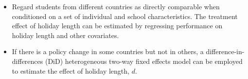 \documentclass[12pt]{article}
\begin{document}
\begin{itemize}
    \item Regard students from different countries as directly comparable when
          conditioned on a set of individual and school characteristics. The treatment
          effect of holiday length can be estimated by regressing performance on holiday
          length and other covariates.
    \item If there is a policy change in some countries but not in others, a
          difference-in-differences (DiD) heterogeneous two-way fixed effects model
          \citet{de2023two} can be employed to estimate the effect of holiday length,
          $d$.
\end{itemize}
\pagebreak
\newpage

\end{document}
